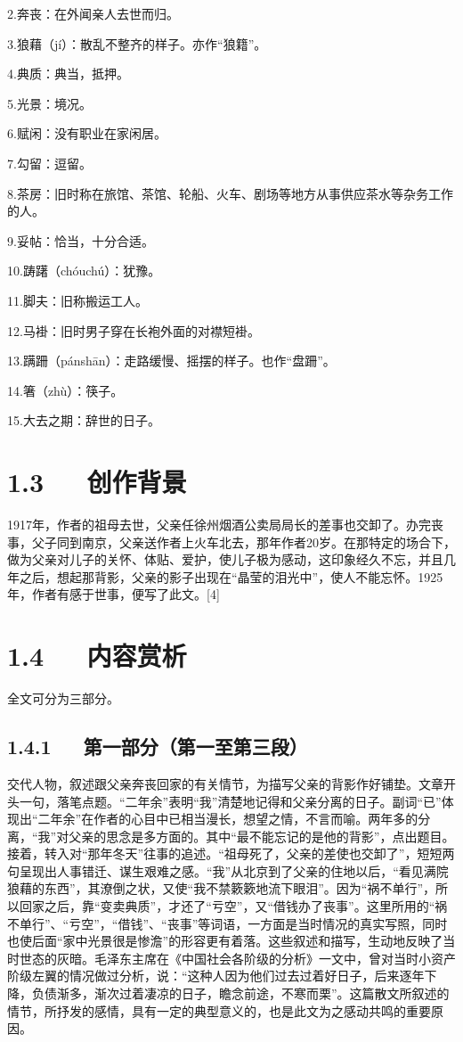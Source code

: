 \documentclass[letterpaper,12pt,english]{sphinxmanual}
\begin{document}
2.奔丧：在外闻亲人去世而归。

3.狼藉（jí）：散乱不整齐的样子。亦作“狼籍”。

4.典质：典当，抵押。

5.光景：境况。

6.赋闲：没有职业在家闲居。

7.勾留：逗留。

8.茶房：旧时称在旅馆、茶馆、轮船、火车、剧场等地方从事供应茶水等杂务工作的人。

9.妥帖：恰当，十分合适。

10.踌躇（chóuchú）：犹豫。

11.脚夫：旧称搬运工人。

12.马褂：旧时男子穿在长袍外面的对襟短褂。

13.蹒跚（pánshān）：走路缓慢、摇摆的样子。也作“盘跚”。

14.箸（zhù）：筷子。

15.大去之期：辞世的日子。


\section{1.3   创作背景}
\label{\detokenize{p01_u6563_u6587/_u6731_u81ea_u6e05-_u80cc_u5f71:id5}}
1917年，作者的祖母去世，父亲任徐州烟酒公卖局局长的差事也交卸了。办完丧事，父子同到南京，父亲送作者上火车北去，那年作者20岁。在那特定的场合下，做为父亲对儿子的关怀、体贴、爱护，使儿子极为感动，这印象经久不忘，并且几年之后，想起那背影，父亲的影子出现在“晶莹的泪光中”，使人不能忘怀。1925年，作者有感于世事，便写了此文。{[}4{]}


\section{1.4   内容赏析}
\label{\detokenize{p01_u6563_u6587/_u6731_u81ea_u6e05-_u80cc_u5f71:id6}}
全文可分为三部分。


\subsection{1.4.1   第一部分（第一至第三段）}
\label{\detokenize{p01_u6563_u6587/_u6731_u81ea_u6e05-_u80cc_u5f71:id7}}
交代人物，叙述跟父亲奔丧回家的有关情节，为描写父亲的背影作好铺垫。文章开头一句，落笔点题。“二年余”表明“我”清楚地记得和父亲分离的日子。副词“已”体现出“二年余”在作者的心目中已相当漫长，想望之情，不言而喻。两年多的分离，“我”对父亲的思念是多方面的。其中“最不能忘记的是他的背影”，点出题目。接着，转入对“那年冬天”往事的追述。“祖母死了，父亲的差使也交卸了”，短短两句呈现出人事错迁、谋生艰难之感。“我”从北京到了父亲的住地以后，“看见满院狼藉的东西”，其潦倒之状，又使“我不禁簌簌地流下眼泪”。因为“祸不单行”，所以回家之后，靠“变卖典质”，才还了“亏空”，又“借钱办了丧事”。这里所用的“祸不单行”、“亏空”，“借钱”、“丧事”等词语，一方面是当时情况的真实写照，同时也使后面“家中光景很是惨澹”的形容更有着落。这些叙述和描写，生动地反映了当时世态的灰暗。毛泽东主席在《中国社会各阶级的分析》一文中，曾对当时小资产阶级左翼的情况做过分析，说：“这种人因为他们过去过着好日子，后来逐年下降，负债渐多，渐次过着凄凉的日子，瞻念前途，不寒而栗”。这篇散文所叙述的情节，所抒发的感情，具有一定的典型意义的，也是此文为之感动共鸣的重要原因。
\end{document}
